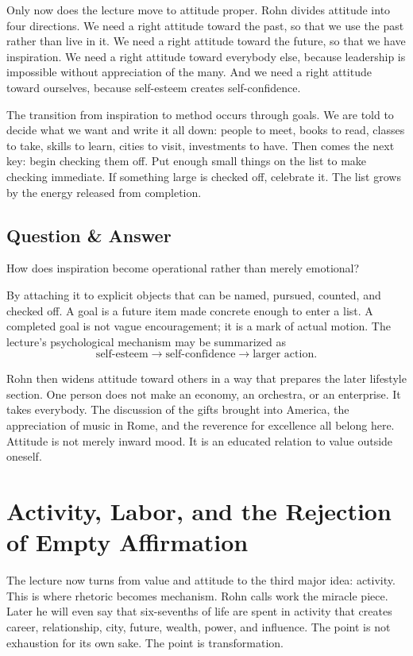 Only now does the lecture move to attitude proper. Rohn divides attitude into four directions. We need a right attitude toward the past, so that we use the past rather than live in it. We need a right attitude toward the future, so that we have inspiration. We need a right attitude toward everybody else, because leadership is impossible without appreciation of the many. And we need a right attitude toward ourselves, because self-esteem creates self-confidence.

The transition from inspiration to method occurs through goals. We are told to decide what we want and write it all down: people to meet, books to read, classes to take, skills to learn, cities to visit, investments to have. Then comes the next key: begin checking them off. Put enough small things on the list to make checking immediate. If something large is checked off, celebrate it. The list grows by the energy released from completion.

\subsection{Question \& Answer}

How does inspiration become operational rather than merely emotional?

By attaching it to explicit objects that can be named, pursued, counted, and checked off. A goal is a future item made concrete enough to enter a list. A completed goal is not vague encouragement; it is a mark of actual motion. The lecture's psychological mechanism may be summarized as
\begin{equation}
\text{self-esteem} \to \text{self-confidence} \to \text{larger action}.
\end{equation}

Rohn then widens attitude toward others in a way that prepares the later lifestyle section. One person does not make an economy, an orchestra, or an enterprise. It takes everybody. The discussion of the gifts brought into America, the appreciation of music in Rome, and the reverence for excellence all belong here. Attitude is not merely inward mood. It is an educated relation to value outside oneself.

\section{Activity, Labor, and the Rejection of Empty Affirmation}

The lecture now turns from value and attitude to the third major idea: activity. This is where rhetoric becomes mechanism. Rohn calls work the miracle piece. Later he will even say that six-sevenths of life are spent in activity that creates career, relationship, city, future, wealth, power, and influence. The point is not exhaustion for its own sake. The point is transformation.

